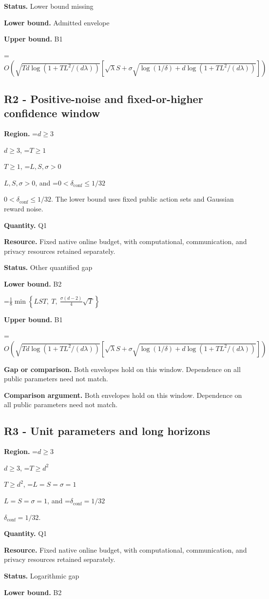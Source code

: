 \documentclass[10pt,a4paper]{article}
\newcommand{\AtlasMath}[1]{\par\begingroup\centering\setbox0=\hbox{$\displaystyle #1$}\ifdim\wd0>1.4\linewidth\typeout{ATLAS WIDE FORMULA: \the\wd0}\fi\ifdim\wd0>\linewidth\resizebox{\linewidth}{!}{\box0}\else\box0\fi\par\endgroup}
\newcommand{\AtlasInlineMath}[1]{\begingroup\setbox0=\hbox{$#1$}\ifdim\wd0>.4\linewidth\endgroup\AtlasMath{#1}\else\endgroup$#1$\fi}
\begin{document}
\textbf{Status.} Lower bound missing

\textbf{Lower bound.} Admitted envelope

\textbf{Upper bound.} B1

\AtlasMath{O\!\left(\sqrt{Td\log(1+TL^2/(d\lambda))}[\sqrt\lambda S+\sigma\sqrt{\log(1/\delta)+d\log(1+TL^2/(d\lambda))}]\right)}
\subsection{R2 - Positive-noise and fixed-or-higher confidence window}
\textbf{Region.} \AtlasInlineMath{d\ge3}, \AtlasInlineMath{T\ge1}, \AtlasInlineMath{L,S,\sigma>0}, and \AtlasInlineMath{0<\delta_{\mathrm{conf}}\le1/32}. The lower bound uses fixed public action sets and Gaussian reward noise.

\textbf{Quantity.} Q1

\textbf{Resource.} Fixed native online budget, with computational, communication, and privacy resources retained separately.

\textbf{Status.} Other quantified gap

\textbf{Lower bound.} B2

\AtlasMath{\frac18\min\!\left\{LST,\ T,\ \frac{\sigma(d-2)}4\sqrt T\right\}}
\textbf{Upper bound.} B1

\AtlasMath{O\!\left(\sqrt{Td\log(1+TL^2/(d\lambda))}[\sqrt\lambda S+\sigma\sqrt{\log(1/\delta)+d\log(1+TL^2/(d\lambda))}]\right)}
\textbf{Gap or comparison.} Both envelopes hold on this window. Dependence on all public parameters need not match.

\textbf{Comparison argument.} Both envelopes hold on this window. Dependence on all public parameters need not match.

\subsection{R3 - Unit parameters and long horizons}
\textbf{Region.} \AtlasInlineMath{d\ge3}, \AtlasInlineMath{T\ge d^2}, \AtlasInlineMath{L=S=\sigma=1}, and \AtlasInlineMath{\delta_{\mathrm{conf}}=1/32}.

\textbf{Quantity.} Q1

\textbf{Resource.} Fixed native online budget, with computational, communication, and privacy resources retained separately.

\textbf{Status.} Logarithmic gap

\textbf{Lower bound.} B2
\end{document}
